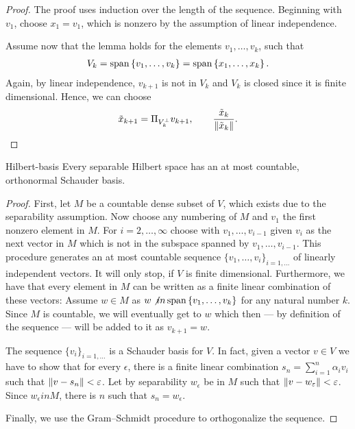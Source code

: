 \begin{proof}
  The proof uses induction over the length of the sequence.  Beginning
  with $v_1$, choose $x_1 = v_1$, which is nonzero by the assumption
  of linear independence.

  Assume now that the lemma holds for the elements $v_1,\dots,v_k$, such that
  \begin{gather*}
    V_k = \operatorname{span}\left\{v_1,\dots,v_k\right\} = \operatorname{span}\left\{x_1,\dots,x_k\right\}.
  \end{gather*}
  Again, by linear independence, $v_{k+1}$ is not in $V_k$ and $V_k$
  is closed since it is finite dimensional. Hence, we can choose
  \begin{gather*}
    \tilde x_{k+1} = \Pi_{V^\perp_k} v_{k+1},
    \qquad \frac{\tilde x_k}{\lVert\tilde x_k\rVert}.
  \end{gather*}
\end{proof}

  
\begin{Theorem}{Hilbert-basis}
  Every separable Hilbert space has an at most countable, orthonormal
  Schauder basis.
\end{Theorem}

\begin{proof}
  First, let $M$ be a countable dense subset
  of $V$, which exists due to the separability assumption. Now choose
  any numbering of $M$ and $v_1$ the first nonzero element in
  $M$. For $i=2,\dots,\infty$ choose with $v_1,\dots,v_{i-1}$ given
  $v_i$ as the next vector in $M$ which is not in the subspace spanned
  by $v_1,\dots,v_{i-1}$. This procedure generates an at most
  countable sequence $\{v_1, \dots, v_i\}_{i=1, \dots}$ of linearly
  independent vectors. It will only stop, if $V$ is finite dimensional.
  Furthermore, we have that every element in $M$ can be written as a finite
  linear combination of these vectors: Assume $w \in M$ as $w \not in
  \operatorname{span}\left\{v_1,\dots,v_k\right\}$ for any natural number $k$. Since $M$ is countable,
  we will eventually get to $w$ which then --- by definition of the sequence
  --- will be added to it as $v_{k+1} = w$.
  
  The sequence $\{v_i\}_{i=1,\dots}$ is a Schauder basis for $V$. In fact, given a
  vector $v\in V$ we have to show that for every $\epsilon$, there is
  a finite linear combination $s_n = \sum_{i=1}^n \alpha_i v_i$ such
  that $\lVert v-s_n\rVert < \varepsilon$. Let by separability $w_\epsilon$ be in
  $M$ such that $\lVert v-w_\varepsilon\rVert < \varepsilon$. Since
  $w_\epsilon in M$, there is $n$ such that $s_n = w_\epsilon$.

  Finally, we use the Gram--Schmidt procedure to orthogonalize the
  sequence.
\end{proof}

